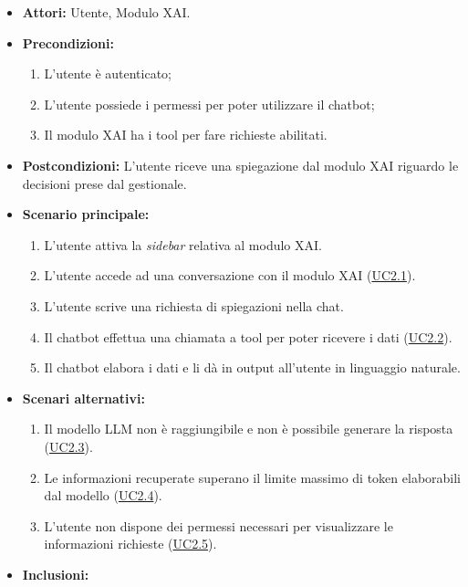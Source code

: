 \label{uc:uc2}
    \begin{itemize}
        \item \textbf{Attori:} Utente, Modulo XAI.
        \item \textbf{Precondizioni:} 
            \begin{enumerate}
                \item L'utente è autenticato; 
                \item L'utente possiede i permessi per poter utilizzare il chatbot;
                \item Il modulo XAI ha i tool per fare richieste abilitati.
            \end{enumerate}
        \item \textbf{Postcondizioni:} L'utente riceve una spiegazione dal modulo XAI riguardo le decisioni prese dal gestionale.
        \item \textbf{Scenario principale:}
            \begin{enumerate}
                \item L'utente attiva la \textit{sidebar} relativa al modulo XAI.
                \item L'utente accede ad una conversazione con il modulo XAI (\hyperref[uc:uc2.1]{UC2.1}).
                \item L'utente scrive una richiesta di spiegazioni nella chat. 
                \item Il chatbot effettua una chiamata a tool per poter ricevere i dati (\hyperref[uc:uc2.2]{UC2.2}).
                \item Il chatbot elabora i dati e li dà in output all'utente in linguaggio naturale.
            \end{enumerate}
        \item \textbf{Scenari alternativi:}
            \begin{enumerate}
                \item Il modello LLM non è raggiungibile e non è possibile generare la risposta (\hyperref[uc:uc2.3]{UC2.3}).
                \item Le informazioni recuperate superano il limite massimo di token elaborabili dal modello (\hyperref[uc:uc2.4]{UC2.4}).
                \item L'utente non dispone dei permessi necessari per visualizzare le informazioni richieste (\hyperref[uc:uc2.5]{UC2.5}).
            \end{enumerate}
        \item \textbf{Inclusioni:}

\end{itemize}
